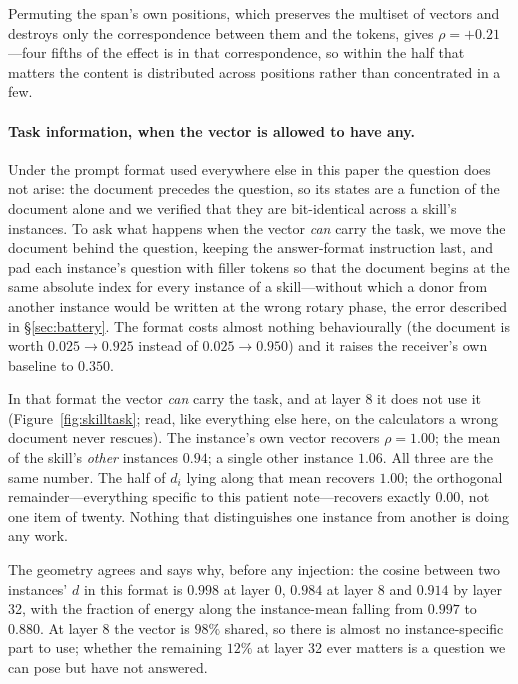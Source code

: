 \documentclass{article}
\newcommand{\dvec}{\ensuremath{d}}
\begin{document}
Permuting the span's own positions, which preserves the multiset of vectors and
destroys only the correspondence between them and the tokens, gives
$\rho = +0.21$---four fifths of the effect is in that correspondence, so within
the half that matters the content is distributed across positions rather than
concentrated in a few.



\paragraph{Task information, when the vector is allowed to have any.} Under the
prompt format used everywhere else in this paper the question does not arise:
the document precedes the question, so its states are a function of the document
alone and we verified that they are bit-identical across a skill's instances.
To ask what happens when the vector \emph{can} carry the task, we move the
document behind the question, keeping the answer-format instruction last, and
pad each instance's question with filler tokens so that the document begins at
the same absolute index for every instance of a skill---without which a donor
from another instance would be written at the wrong rotary phase, the error
described in \S\ref{sec:battery}. The format costs almost nothing behaviourally
(the document is worth $0.025 \to 0.925$ instead of $0.025 \to 0.950$) and it
raises the receiver's own baseline to $0.350$.

In that format the vector \emph{can} carry the task, and at layer 8 it does not
use it (Figure~\ref{fig:skilltask}; read, like everything else here, on the
calculators a wrong document never rescues). The instance's own vector recovers
$\rho = 1.00$; the mean of the skill's \emph{other} instances $0.94$; a single
other instance $1.06$. All three are the same number. The half of $\dvec_i$
lying along that mean recovers $1.00$; the orthogonal remainder---everything
specific to this patient note---recovers exactly $0.00$, not one item of twenty.
Nothing that distinguishes one instance from another is doing any work.

The geometry agrees and says why, before any injection: the cosine between two
instances' $\dvec$ in this format is $0.998$ at layer 0, $0.984$ at layer 8 and
$0.914$ by layer 32, with the fraction of energy along the instance-mean falling
from $0.997$ to $0.880$. At layer 8 the vector is $98\%$ shared, so there is
almost no instance-specific part to use; whether the remaining $12\%$ at layer 32
ever matters is a question we can pose but have not answered.
\end{document}
